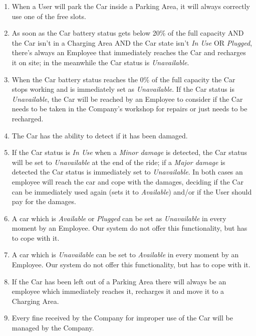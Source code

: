 \begin{enumerate}
	\item When a User will park the Car inside a Parking Area, it will always correctly use one of the free slots.
	\item As soon as the Car battery status gets below 20\% of the full capacity AND the Car isn't in a Charging Area AND the Car state isn't \textit{In Use} OR \textit{Plugged}, there's always an Employee that immediately reaches the Car and recharges it on site; in the meanwhile the Car status is \textit{Unavailable}.	
	\item When the Car battery status reaches the 0\% of the full capacity the Car stops working and is immediately set as \textit{Unavailable}.
	If the Car status is \textit{Unavailable}, the Car will be reached by an Employee to consider if the Car needs to be taken in the Company's workshop for repairs or just needs to be recharged.
	\item The Car has the ability to detect if it has been damaged. 
	\item If the Car status is \textit{In Use} when a \textit{Minor damage} is detected, the Car status will be set to \textit{Unavailable} at the end of the ride; if a \textit{Major damage} is detected the Car status is immediately set to \textit{Unavailable}. In both cases an employee will reach the car and cope with the damages, deciding if the Car can be immediately used again (sets it to \textit{Available}) and/or if the User should pay for the damages. 
	\item A car which is \textit{Available} or \textit{Plugged} can be set as \textit{Unavailable} in every moment by an Employee. Our system do not offer this functionality, but has to cope with it.
	\item A car which is \textit{Unavailable} can be set to \textit{Available} in every moment by an Employee. Our system do not offer this functionality, but has to cope with it.
	\item If the Car has been left out of a Parking Area there will always be an employee which immediately reaches it, recharges it and move it to a Charging Area. 
	\item Every fine received by the Company for improper use of the Car will be managed by the Company.
\end{enumerate}

\clearpage